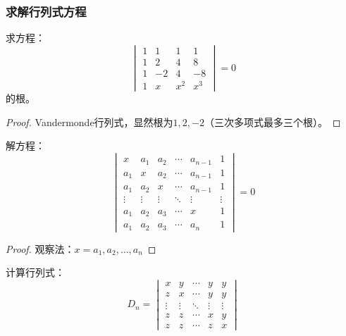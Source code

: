 \subsubsection{求解行列式方程}
\begin{theorem}
	求方程：
	\begin{equation*}
		\begin{vmatrix}
			1 & 1 & 1 & 1 \\
			1 & 2 & 4 & 8 \\
			1 & -2 & 4 & -8 \\
			1 & x & x^2 & x^3
		\end{vmatrix}=0
	\end{equation*}
	的根。
\end{theorem}
\begin{proof}
	Vandermonde行列式，显然根为$1,2,-2$（三次多项式最多三个根）。
\end{proof}
\begin{theorem}
	解方程：
	\begin{equation*}
		\begin{vmatrix}
			x & a_1 & a_2 & \cdots & a_{n-1} & 1 \\
			a_1 & x & a_2 & \cdots & a_{n-1} & 1 \\
			a_1 & a_2 & x & \cdots & a_{n-1} & 1 \\
			\vdots & \vdots & \vdots & \ddots & \vdots & \vdots \\
			a_1 & a_2 & a_3 & \cdots & x & 1 \\
			a_1 & a_2 & a_3 & \cdots & a_n & 1
		\end{vmatrix}=0
	\end{equation*}
\end{theorem}
\begin{proof}
	观察法：$x=a_1,a_2,\dots,a_n$
\end{proof}
\begin{theorem}
	计算行列式：
	\begin{equation*}
		D_n=
		\begin{vmatrix}
			x & y & \cdots & y & y \\
			z & x & \cdots & y & y \\
			\vdots & \vdots & \ddots & \vdots & \vdots \\
			z & z & \cdots & x & y \\
			z & z & \cdots & z & x
		\end{vmatrix}
	\end{equation*}
\end{theorem}
